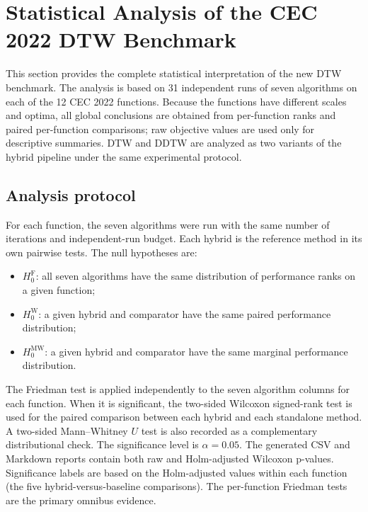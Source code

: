 
\section{Statistical Analysis of the CEC 2022 DTW Benchmark}
\label{sec:cec2022-dtw-statistics}

This section provides the complete statistical interpretation of the new DTW
benchmark. The analysis is based on 31 independent runs of seven algorithms on
each of the 12 CEC 2022 functions. Because the functions have different
scales and optima, all global conclusions are obtained from per-function
ranks and paired per-function comparisons; raw objective values are used only
for descriptive summaries. DTW and DDTW are analyzed as two variants of the
hybrid pipeline under the same experimental protocol.

\subsection{Analysis protocol}

For each function, the seven algorithms were run with the same number of
iterations and independent-run budget. Each hybrid is the reference method in
its own pairwise tests. The null hypotheses are:

\begin{itemize}
  \item $H_0^{\mathrm{F}}$: all seven algorithms have the same distribution of
  performance ranks on a given function;
  \item $H_0^{\mathrm{W}}$: a given hybrid and comparator have the same
  paired performance distribution;
  \item $H_0^{\mathrm{MW}}$: a given hybrid and comparator have the same
  marginal performance distribution.
\end{itemize}

The Friedman test is applied independently to the seven algorithm columns for
each function. When it is significant, the two-sided Wilcoxon signed-rank test
is used for the paired comparison between each hybrid and each standalone
method. A two-sided Mann--Whitney $U$ test is also recorded as a complementary
distributional check. The significance level is $\alpha=0.05$. The generated
CSV and Markdown reports contain both raw and Holm-adjusted Wilcoxon p-values.
Significance labels are based on the Holm-adjusted values within each function
(the five hybrid-versus-baseline comparisons). The per-function Friedman tests
are the primary omnibus evidence.

